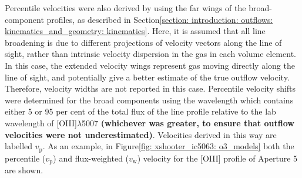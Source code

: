 Percentile velocities were also derived by using the far wings of the broad-component profiles, as described in Section\;\ref{section: introduction: outflows: kinematics_and_geometry: kinematics}. Here, it is assumed that all line broadening is due to different projections of velocity vectors along the line of sight, rather than intrinsic velocity dispersion in the gas in each volume element. In this case, the extended velocity wings represent gas moving directly along the line of sight, and potentially give a better estimate of the true outflow velocity. Therefore, velocity widths are not reported in this case. Percentile velocity shifts were determined for the broad components using the wavelength which contains either 5 or 95 per cent of the total flux of the line profile relative to the lab wavelength of [OIII]$\lambda$5007 \textbf{(whichever was greater, to ensure that outflow velocities were not underestimated)}. Velocities derived in this way are labelled $v_\mathrm{p}$. As an example, in Figure\;\ref{fig: xshooter_ic5063: o3_models} both the percentile ($v_\mathrm{p}$) and flux-weighted ($v_\mathrm{w}$) velocity for the [OIII] profile of Aperture 5 are shown.

